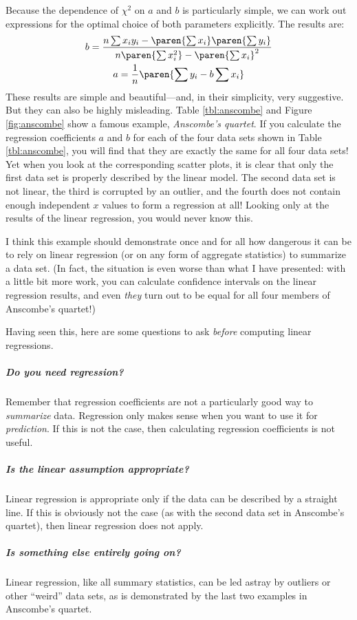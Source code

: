Because the dependence of $\chi^2$ on $a$ and $b$ is particularly
simple, we can work out expressions for the optimal choice of both
parameters explicitly. The results are:
%
\begin{gather*}
b = \frac{n \sum x_i y_i - \paren{\sum x_i} \paren{\sum y_i} }
         {n \paren{\sum x_i^2} - \paren{\sum x_i}^2 } \\
a = \frac{1}{n} \paren{\sum y_i - b \sum x_i}
\end{gather*}
%
These results are simple and beautiful---and, in their simplicity,
very suggestive. But they can also be highly misleading.  Table
\ref{tbl:anscombe} and Figure \ref{fig:anscombe} show a famous
example, \emph{Anscombe's quartet}.  If you calculate the
regression coefficients $a$ and $b$ for each of the four data sets shown in Table
\ref{tbl:anscombe}, you will find that they are exactly the same for
all four data sets! Yet when you look at the corresponding scatter
plots, it is clear that only the first data set is properly described
by the linear model. The second data set is not linear, the third is
corrupted by an outlier, and the fourth does not contain enough
independent $x$ values to form a regression at all! Looking only at
the results of the linear regression, you would never know this.

 

I think this example should demonstrate once and for all how dangerous
it can be to rely on linear regression (or on any form of aggregate
statistics) to summarize a data set. (In fact, the situation is even
worse than what I have presented: with a little bit more work, you can
calculate confidence intervals on the linear regression results, and
even \emph{they} turn out to be equal for all four members of
Anscombe's quartet!)

Having seen this, here are some questions to ask \emph{before}
computing linear regressions.

\begin{unnumlist}
\subparagraph{Do you need regression?}
\item Remember that regression coefficients
  are not a particularly good way to \emph{summarize} data. Regression
  only makes sense when you want to use it for \emph{prediction}. If
  this is not the case, then calculating regression coefficients is not
  useful.

\subparagraph{Is the linear assumption appropriate?}
\item Linear regression is 
  appropriate only if the data can be described by a straight line.
  If this is obviously not the case (as with the second data set in
  Anscombe's quartet), then linear regression does not apply. 

\subparagraph{Is something else entirely going on?} 
\item
Linear regression,
  like all summary statistics, can be led astray by outliers or
  other ``weird'' data sets, as is demonstrated by the last two
  examples in Anscombe's quartet. 
\end{unnumlist}

